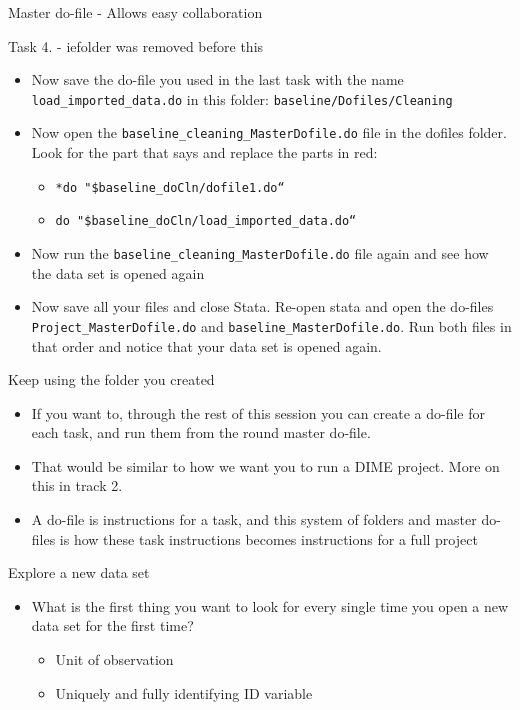 \documentclass[aspectratio=169]{beamer}
\newcommand{\codeexample}[2]{
	\begin{figure}
		\VerbatimInput[
		framesep=3mm,
		frame=lines, %
		numbers=left, %
		label= #1, %
		baselinestretch=0.90, %
		]{#2} %
	\end{figure}
	\FloatBarrier
}
\begin{document}
\begin{frame}[fragile]{Master do-file - Allows easy collaboration}
	\codeexample{master-dofile-rootpath.do}{code/master-dofile-rootpath.do}
\end{frame}

\begin{frame}{Task 4. - iefolder was removed before this}
	\begin{itemize}
		\item Now save the do-file you used in the last task with the name \texttt{load\_imported\_data.do} in this folder: \texttt{baseline/Dofiles/Cleaning}
		\item Now open the \texttt{baseline\_cleaning\_MasterDofile.do} file in the dofiles folder. Look for the part that says and replace the parts in red:
		\begin{itemize}
			\item \texttt{*do "\$baseline\_doCln/dofile1.do“}
			\item \texttt{do "\$baseline\_doCln/load\_imported\_data.do“}
		\end{itemize}
		\item Now run the \texttt{baseline\_cleaning\_MasterDofile.do} file again and see how the data set is opened again
		\item Now save all your files and close Stata. Re-open stata and open the do-files \texttt{Project\_MasterDofile.do} and \texttt{baseline\_MasterDofile.do}. Run both files in that order and notice that your data set is opened again. 
	\end{itemize}
\end{frame}


\begin{frame}{Keep using the folder you created}
	\begin{itemize}
		\item If you want to, through the rest of this session you can create a do-file for each task, and run them from the round master do-file.	
		\item That would be similar to how we want you to run a DIME project. More on this in track 2.
		\item A do-file is instructions for a task, and this system of folders and master do-files is how these task instructions becomes instructions for a full project 
	\end{itemize}
\end{frame}



\begin{frame}{Explore a new data set}
	\begin{itemize}
		\item What is the first thing you want to look for every single time you open a new data set for the first time?
		\begin{itemize}
			\item Unit of observation
			\item Uniquely and fully identifying ID variable
		\end{itemize}
	\end{itemize}
\end{frame}
\end{document}
